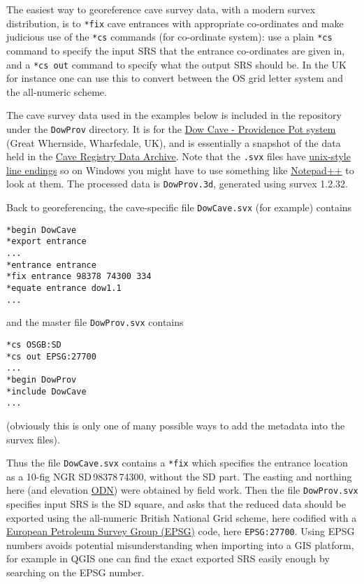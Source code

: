 \documentclass[]{article}
\begin{document}
The easiest way to georeference cave survey data, with a modern survex
distribution, is to \verb}*fix} cave entrances with appropriate
co-ordinates and make judicious use of the \verb}*cs} commands (for
co-ordinate system): use a plain \verb}*cs} command to specify the
input SRS that the entrance co-ordinates are given in, and a
\verb}*cs out} command to specify what the output SRS should be. In
the UK for instance one can use this to convert between the OS grid
letter system and the all-numeric scheme.

The cave survey data used in the examples below is included in the
repository under the \verb}DowProv} directory. It is for the
\href{http://www.mudinmyhair.co.uk/}{Dow Cave - Providence Pot system}
(Great Whernside, Wharfedale, UK), and is essentially a snapshot of the
data held in the \href{http://cave-registry.org.uk/}{Cave Registry Data
Archive}. Note that the \verb}.svx} files have
\href{https://en.wikipedia.org/wiki/Newline}{unix-style line endings} so
on Windows you might have to use something like
\href{https://notepad-plus-plus.org/}{Notepad{\small++}} to look at them. The
processed data is \verb}DowProv.3d}, generated using survex 1.2.32.

Back to georeferencing, the cave-specific file \verb}DowCave.svx} (for
example) contains

\begin{verbatim}
*begin DowCave
*export entrance
...
*entrance entrance
*fix entrance 98378 74300 334
*equate entrance dow1.1
...
\end{verbatim}

and the master file \verb}DowProv.svx} contains

\begin{verbatim}
*cs OSGB:SD
*cs out EPSG:27700
...
*begin DowProv
*include DowCave
...
\end{verbatim}

(obviously this is only one of many possible ways to add the metadata
into the survex files).

Thus the file \verb}DowCave.svx} contains a \verb}*fix} which
specifies the entrance location as a 10-fig NGR
SD\,98378\,74300, without the SD part. The easting and
northing here (and elevation
\href{https://en.wikipedia.org/wiki/Ordnance_datum}{ODN}) were obtained
by field work. Then the file \verb}DowProv.svx} specifies input SRS is
the SD square, and asks that the reduced data should be exported
using the all-numeric British National Grid scheme, here codified with a
\href{http://spatialreference.org/}{European Petroleum Survey Group
  (EPSG)} code, here \verb+EPSG:27700+.
Using EPSG numbers avoids potential misunderstanding when
importing into a GIS platform, for example in QGIS one can find the
exact exported SRS easily enough by searching on the EPSG number.
\end{document}

